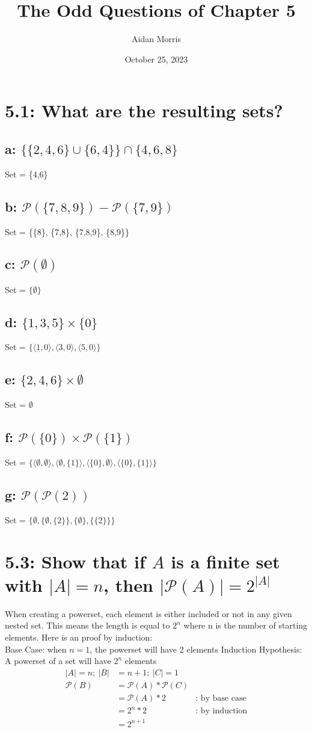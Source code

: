 \documentclass{article}
\title{The Odd Questions of Chapter 5}
\author{Aidan Morris}
\date{October 25, 2023}
\begin{document}
\maketitle
\pagebreak

\section*{5.1: What are the resulting sets?}
\subsection*{a: $\{\{2,4,6\}\cup\{6,4\}\}\cap\{4,6,8\}$}
Set = \{4,6\}
\subsection*{b: $\mathcal{P}(\{7,8,9\}) - \mathcal{P}(\{7,9\}) $}
Set = \{\{8\}, \{7,8\}, \{7,8,9\}, \{8,9\}\}
\subsection*{c: $\mathcal{P}(\emptyset)$}
Set = $\{\emptyset\}$
\subsection*{d: $\{1,3,5\} \times \{0\}$}
Set = $\{\langle1,0\rangle, \langle3,0\rangle, \langle5,0\rangle\}$
\subsection*{e: $\{2,4,6\} \times \emptyset$}
Set = $\emptyset$
\subsection*{f: $\mathcal{P}(\{0\}) \times \mathcal{P}(\{1\})$}
Set = $\{\langle\emptyset,\emptyset\rangle, \langle\emptyset, \{1\}\rangle, \langle \{0\},\emptyset \rangle, \langle \{0\},\{1\} \rangle \}$
\subsection*{g: $\mathcal{P}(\mathcal{P}({2}))$}
Set = $\{\emptyset,\{\emptyset,\{2\}\}, \{\emptyset\}, \{\{2\}\}\}$
\section*{5.3: Show that if $A$ is a finite set with $|A| = n$, then $|\mathcal{P}(A)| = 2^{|A|}$}
When creating a powerset, each element is either included or not in any given nested set. This means the length is equal to $2^n$ where n is the number of starting elements. Here is an proof by induction: \\
Base Case: when $n = 1$, the powerset will have 2 elements
Induction Hypothesis: A powerset of a set will have $2^n$ elements
\begin{align*}
  |A| = n; \: |B| &= n + 1; \: |C| = 1\\
  \mathcal{P}(B) &= \mathcal{P}(A) * \mathcal{P}(C) \\
  &= \mathcal{P}(A) * 2 \: &\textrm{: by base case} \\
  &= 2^n * 2 \: &\textrm{: by induction} \\
  &= 2^{n+1}
\end{align*}
\end{document}
